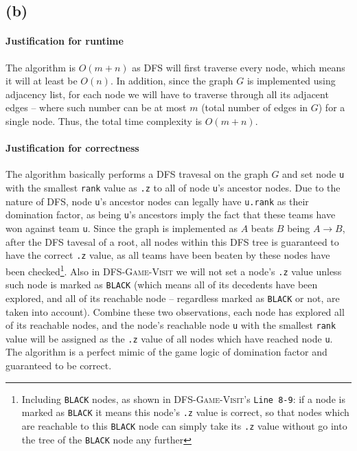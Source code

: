 \documentclass[11pt]{article}
\newcommand{\ilc}{\texttt}
\begin{document}
\subsection{(b)}

\paragraph{Justification for runtime} The algorithm is $O(m+n)$ as DFS will first traverse every node, which means it will at least be $O(n)$. In addition, since the graph $G$ is implemented using adjacency list, for each node we will have to traverse through all its adjacent edges -- where such number can be at most $m$ (total number of edges in $G$) for a single node. Thus, the total time complexity is $O(m + n)$.

\paragraph{Justification for correctness} The algorithm basically performs a DFS travesal on the graph $G$ and set node \ilc{u} with the smallest \ilc{rank} value as \ilc{.z} to all of node \ilc{u}'s ancestor nodes. Due to the nature of DFS, node \ilc{u}'s ancestor nodes can legally have \ilc{u.rank} as their domination factor, as being \ilc{u}'s ancestors imply the fact that these teams have won against team \ilc{u}. Since the graph is implemented as $A$ beats $B$ being $A \rightarrow B$, after the DFS tavesal of a root, all nodes within this DFS tree is guaranteed to have the correct \ilc{.z} value, as all teams have been beaten by these nodes have been checked\footnote{Including \ilc{BLACK} nodes, as shown in \textsc{DFS-Game-Visit}'s \ilc{Line 8-9}: if a node is marked as \ilc{BLACK} it means this node's \ilc{.z} value is correct, so that nodes which are reachable to this \ilc{BLACK} node can simply take its \ilc{.z} value without go into the tree of the \ilc{BLACK} node any further}. \newline
Also in \textsc{DFS-Game-Visit} we will not set a node's \ilc{.z} value unless such node is marked as \ilc{BLACK} (which means all of its decedents have been explored, and all of its reachable node -- regardless marked as \ilc{BLACK} or not, are taken into account). Combine these two observations, each node has explored all of its reachable nodes, and the node's reachable node \ilc{u} with the smallest \ilc{rank} value will be assigned as the \ilc{.z} value of all nodes which have reached node \ilc{u}. The algorithm is a perfect mimic of the game logic of domination factor and guaranteed to be correct.\newline
\end{document}
